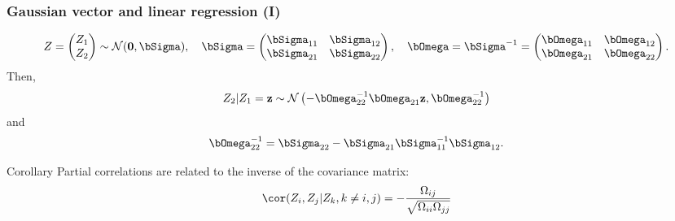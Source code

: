 \begin{frame}
  \frametitle{Gaussian vector and linear regression (I)}

  \begin{proposition}
    \begin{equation*}
      Z = \begin{pmatrix}
        Z_1 \\ Z_2
      \end{pmatrix}  \sim   \mathcal{N}(\mathbf{0},\bSigma),   \quad
      \bSigma = \begin{pmatrix}
        \bSigma_{11} & \bSigma_{12} \\
        \bSigma_{21} & \bSigma_{22} \\
      \end{pmatrix},\quad
      \bOmega = \bSigma^{-1} = \begin{pmatrix}
        \bOmega_{11} & \bOmega_{12} \\
        \bOmega_{21} & \bOmega_{22} \\
      \end{pmatrix}.
    \end{equation*}
    Then,
    \begin{equation*}
      Z_2|Z_1=\mathbf{z} \sim
      \mathcal{N}\left(-\bOmega_{22}^{-1}\bOmega_{21}\mathbf{z}, \bOmega_{22}^{-1} \right)
    \end{equation*}
    and
    \begin{equation*}
      \bOmega_{22}^{-1}     =      \bSigma_{22}     -     \bSigma_{21}
      \bSigma_{11}^{-1} \bSigma_{12}.
    \end{equation*}
  \end{proposition}

  \vfill

  \begin{block}{Corollary}
    Partial correlations are related  to the inverse of the covariance
    matrix:
    \begin{equation*}
      \cor(Z_i,Z_j|Z_k, k\neq i,j) = - \frac{\Omega_{ij}}{\sqrt{\Omega_{ii}\Omega_{jj}}}
  \end{equation*}
  \end{block}

\end{frame}


